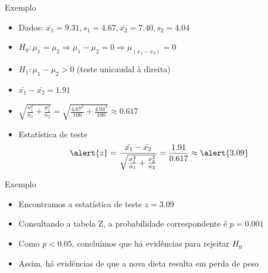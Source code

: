 \documentclass{beamer}
\begin{document}
\begin{frame}{Exemplo}
  \begin{example}
    \begin{itemize}
    \item Dados: $\bar{x_1}=9.31, s_1=4.67, \bar{x_2}=7.40, s_2 = 4.04$
    \item $H_0: \mu_1 = \mu_2 \Rightarrow \mu_1 - \mu_2 = 0 \Rightarrow \mu_{(x_1 - x_2)} = 0$
    \item $H_1: \mu_1 - \mu_2 > 0$ (teste unicaudal à direita)
    \item $\bar{x_1}-\bar{x_2}=1.91$
    \item $\sqrt{\frac{\sigma_1^2}{n_1} + \frac{\sigma^2_2}{n_2}} =
      \sqrt{\frac{4.67^2}{100} + \frac{4.04^2}{100}} \approx 0.617$
    \item Estatística de teste
      \begin{displaymath}
        \alert{z} = \frac{\bar{x_1}-\bar{x_2}}{\sqrt{\frac{\sigma_1^2}{n_1} +
            \frac{\sigma^2_2}{n_2}}} = \frac{1.91}{0.617} \approx \alert{3.09}
      \end{displaymath}
    \end{itemize}
  \end{example}
\end{frame}

\begin{frame}{Exemplo}
  \begin{example}
    \begin{itemize}
    \item Encontramos a estatística de teste $z=3.09$
    \item Consultando a tabela Z, a probabilidade correspondente é
      $p=0.001$
    \item Como $p<0.05$, concluímos que há evidências para rejeitar $H_0$
    \item Assim, há evidências de que a nova dieta resulta em perda de
      peso
    \end{itemize}
  \end{example}
\end{frame}

\end{document}
